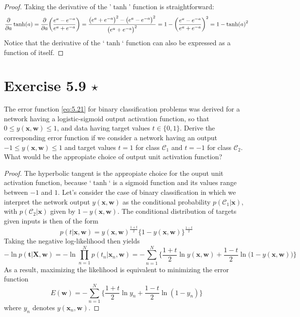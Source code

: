 \vspace{1em}

\begin{proof}
    Taking the derivative of the '$\tanh$' function is straightforward:
    \[
        \pdv{a} \tanh(a) 
        = \pdv{a} \bigg(\frac{e^a - e^{-a}}{e^a + e^{-a}}\bigg)
        = \frac{\big(e^a + e^{-a}\big)^2 - \big(e^a - e^{-a}\big)^2}{\big(e^a + e^{-a}\big)^2}
        = 1 - \bigg(\frac{e^a - e^{-a}}{e^a + e^{-a}}\bigg)^2
        = 1 - \tanh(a)^2
    \] 
    Notice that the derivative of the `$\tanh$` function can also be expressed
    as a function of itself.
\end{proof}

\section*{Exercise 5.9 $\star$}
The error function \eqref{eq:5.21} for binary classification problems
was derived for a network having a logistic-sigmoid output activation
function, so that $0 \leq y(\mathbf{x}, \mathbf{w}) \leq 1$, and data having
target values $t \in \{0, 1\}$. Derive the corresponding error function
if we consider a network having an output $-1 \leq y(\mathbf{x}, \mathbf{w}) \leq 1$
and target values $t = 1$ for class $\mathcal{C}_1$ and $t = -1$ for
class  $\mathcal{C}_2$. What would be the appropiate choice of output
unit activation function?

\vspace{1em}

\begin{proof}
    The hyperbolic tangent is the appropiate choice for the ouput unit
    activation function, because `$\tanh$` is a sigmoid function and its
    values range between $-1$ and $1$. Let's consider the case of binary 
    classification in which we interpret the network output $y(\mathbf{x}, \mathbf{w})$
    as the conditional probability $p(\mathcal{C}_1 | \mathbf{x})$, with
    $p(\mathcal{C}_2 | \mathbf{x})$ given by $1 - y(\mathbf{x}, \mathbf{w})$. The
    conditional distribution of targets given inputs is then of the form
    \[
        p(t | \mathbf{x}, \mathbf{w}) 
        = y(\mathbf{x}, \mathbf{w})^{\frac{1+t}{2}} 
        \big\{1 - y(\mathbf{x}, \mathbf{w})\big\}^{\frac{1-t}{2}}
    \] 
    Taking the negative log-likelihood then yields
    \[
        -\ln p(\mathbf{t} | \mathbf{X}, \mathbf{w})
        = -\ln \prod_{n = 1}^N p(t_n | \mathbf{x}_n, \mathbf{w})
        = -\sum_{n=1}^{N} \bigg\{\frac{1+t}{2} \ln y(\mathbf{x}, \mathbf{w}) 
        + \frac{1-t}{2} \ln\big(1 - y(\mathbf{x}, \mathbf{w})\big)\bigg\}
    \] 
    As a result, maximizing the likelihood is equivalent to minimizing 
    the error function
    \[
        E(\mathbf{w}) = -\sum_{n=1}^{N} \bigg\{\frac{1+t}{2} \ln y_n + \frac{1-t}{2} \ln(1 -  y_n)\bigg\}
    \] 
    where $y_n$ denotes $y(\mathbf{x}_n, \mathbf{w})$.
\end{proof}

